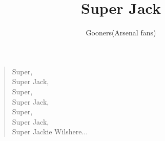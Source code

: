 \documentclass[a4paper,12pt]{article}
\title{Super Jack}
\author{Gooners(Arsenal fans)}
\date{}
\begin{document}
	
	\maketitle
	
	\begin{verse}
		
		Super, \\
		Super Jack, \\
		Super, \\
		Super Jack, \\
		Super, \\
		Super Jack, \\
		Super Jackie Wilshere$\ldots$
		
	\end{verse}
	
\end{document}
